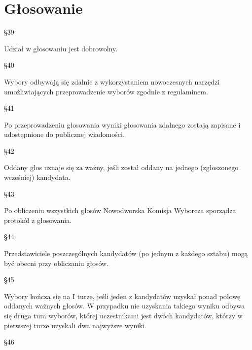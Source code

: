 \documentclass[12pt]{article}
\begin{document}
\section{Głosowanie}
    \begin{center}
        \S 39\\
    \end{center}
    Udział w głosowaniu jest dobrowolny.\\
    \begin{center}
        \S 40\\
    \end{center}
    Wybory odbywają się zdalnie z wykorzystaniem nowoczesnych narzędzi umożliwiających przeprowadzenie wyborów zgodnie z regulaminem.\\
    \begin{center}
        \S 41\\
    \end{center}
    Po przeprowadzeniu głosowania wyniki głosowania zdalnego zostają zapisane i udostępnione do publicznej wiadomości. \\
    \begin{center}
        \S 42\\
    \end{center}
    Oddany głos uznaje się za ważny, jeśli został oddany na jednego (zgłoszonego wcześniej) kandydata.\\
    \begin{center}
        \S 43\\
    \end{center}
    Po obliczeniu wszystkich głosów Nowodworska Komisja Wyborcza sporządza protokół z głosowania.\\
    \begin{center}
        \S 44\\
    \end{center}
    Przedstawiciele poszczególnych kandydatów (po jednym z każdego sztabu) mogą być obecni przy obliczaniu głosów.\\
    \begin{center}
        \S 45\\
    \end{center}
    Wybory kończą się na I turze, jeśli jeden z kandydatów uzyskał ponad połowę oddanych ważnych głosów. W przypadku nie uzyskania takiego wyniku odbywa się druga tura wyborów, której uczestnikami jest dwóch kandydatów, którzy w pierwszej  turze uzyskali dwa najwyższe wyniki.\\
    \begin{center}
        \S 46\\
    \end{center}
\end{document}
